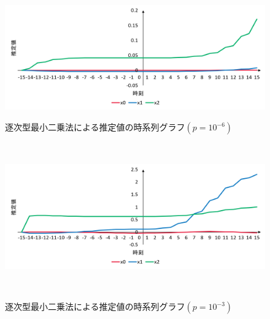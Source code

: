 \documentclass[a4paper]{jarticle}
\begin{document}
\begin{figure}[!h]
  \centering
  \includegraphics[width=16cm]{Seq-6.png}
  \caption{逐次型最小二乗法による推定値の時系列グラフ\( (p=10^{-6}) \)}
　\label{graph}

  \centering
  \includegraphics[width=16cm]{Seq-3.png}
  \caption{逐次型最小二乗法による推定値の時系列グラフ\( (p=10^{-3}) \)}
　\label{graph}
\end{figure}
\end{document}
